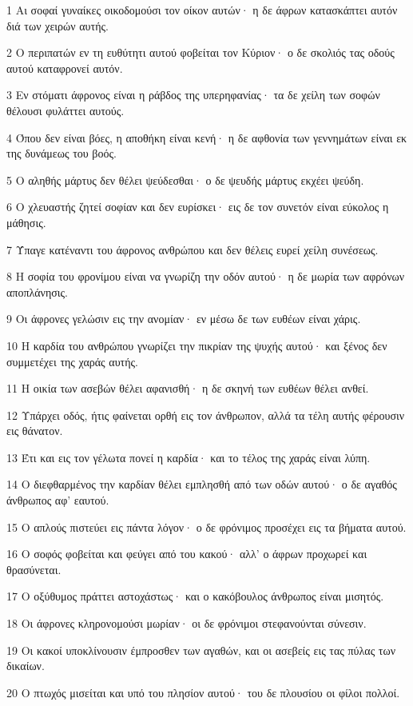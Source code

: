 \par 1 Αι σοφαί γυναίκες οικοδομούσι τον οίκον αυτών· η δε άφρων κατασκάπτει αυτόν διά των χειρών αυτής.
\par 2 Ο περιπατών εν τη ευθύτητι αυτού φοβείται τον Κύριον· ο δε σκολιός τας οδούς αυτού καταφρονεί αυτόν.
\par 3 Εν στόματι άφρονος είναι η ράβδος της υπερηφανίας· τα δε χείλη των σοφών θέλουσι φυλάττει αυτούς.
\par 4 Όπου δεν είναι βόες, η αποθήκη είναι κενή· η δε αφθονία των γεννημάτων είναι εκ της δυνάμεως του βοός.
\par 5 Ο αληθής μάρτυς δεν θέλει ψεύδεσθαι· ο δε ψευδής μάρτυς εκχέει ψεύδη.
\par 6 Ο χλευαστής ζητεί σοφίαν και δεν ευρίσκει· εις δε τον συνετόν είναι εύκολος η μάθησις.
\par 7 Ύπαγε κατέναντι του άφρονος ανθρώπου και δεν θέλεις ευρεί χείλη συνέσεως.
\par 8 Η σοφία του φρονίμου είναι να γνωρίζη την οδόν αυτού· η δε μωρία των αφρόνων αποπλάνησις.
\par 9 Οι άφρονες γελώσιν εις την ανομίαν· εν μέσω δε των ευθέων είναι χάρις.
\par 10 Η καρδία του ανθρώπου γνωρίζει την πικρίαν της ψυχής αυτού· και ξένος δεν συμμετέχει της χαράς αυτής.
\par 11 Η οικία των ασεβών θέλει αφανισθή· η δε σκηνή των ευθέων θέλει ανθεί.
\par 12 Υπάρχει οδός, ήτις φαίνεται ορθή εις τον άνθρωπον, αλλά τα τέλη αυτής φέρουσιν εις θάνατον.
\par 13 Έτι και εις τον γέλωτα πονεί η καρδία· και το τέλος της χαράς είναι λύπη.
\par 14 Ο διεφθαρμένος την καρδίαν θέλει εμπλησθή από των οδών αυτού· ο δε αγαθός άνθρωπος αφ' εαυτού.
\par 15 Ο απλούς πιστεύει εις πάντα λόγον· ο δε φρόνιμος προσέχει εις τα βήματα αυτού.
\par 16 Ο σοφός φοβείται και φεύγει από του κακού· αλλ' ο άφρων προχωρεί και θρασύνεται.
\par 17 Ο οξύθυμος πράττει αστοχάστως· και ο κακόβουλος άνθρωπος είναι μισητός.
\par 18 Οι άφρονες κληρονομούσι μωρίαν· οι δε φρόνιμοι στεφανούνται σύνεσιν.
\par 19 Οι κακοί υποκλίνουσιν έμπροσθεν των αγαθών, και οι ασεβείς εις τας πύλας των δικαίων.
\par 20 Ο πτωχός μισείται και υπό του πλησίον αυτού· του δε πλουσίου οι φίλοι πολλοί.
